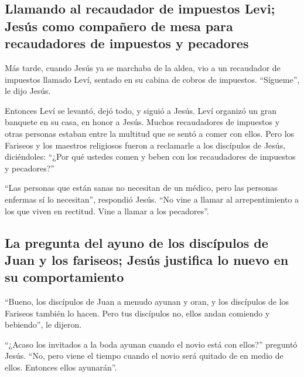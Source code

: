 \hypertarget{llamando-al-recaudador-de-impuestos-levi-jesuxfas-como-compauxf1ero-de-mesa-para-recaudadores-de-impuestos-y-pecadores}{%
\subsection{Llamando al recaudador de impuestos Levi; Jesús como
compañero de mesa para recaudadores de impuestos y
pecadores}\label{llamando-al-recaudador-de-impuestos-levi-jesuxfas-como-compauxf1ero-de-mesa-para-recaudadores-de-impuestos-y-pecadores}}

 Más tarde, cuando Jesús ya se marchaba de la aldea, vio
a un recaudador de impuestos llamado Leví, sentado en su cabina de
cobros de impuestos. ``Sígueme'', le dijo Jesús.

 Entonces Leví se levantó, dejó todo, y siguió a Jesús.
 Leví organizó un gran banquete en su casa, en honor a
Jesús. Muchos recaudadores de impuestos y otras personas estaban entre
la multitud que se sentó a comer con ellos. Pero los Fariseos y los
maestros religiosos fueron a reclamarle a los discípulos de Jesús,
diciéndoles:  ``¿Por qué ustedes comen y beben con los
recaudadores de impuestos y pecadores?''

 ``Las personas que están sanas no necesitan de un
médico, pero las personas enfermas sí lo necesitan'', respondió Jesús.
 ``No vine a llamar al arrepentimiento a los que viven en
rectitud. Vine a llamar a los pecadores''.

\hypertarget{la-pregunta-del-ayuno-de-los-discuxedpulos-de-juan-y-los-fariseos-jesuxfas-justifica-lo-nuevo-en-su-comportamiento}{%
\subsection{La pregunta del ayuno de los discípulos de Juan y los
fariseos; Jesús justifica lo nuevo en su
comportamiento}\label{la-pregunta-del-ayuno-de-los-discuxedpulos-de-juan-y-los-fariseos-jesuxfas-justifica-lo-nuevo-en-su-comportamiento}}

 ``Bueno, los discípulos de Juan a menudo ayunan y oran,
y los discípulos de los Fariseos también lo hacen. Pero tus discípulos
no, ellos andan comiendo y bebiendo'', le dijeron.

 ``¿Acaso los invitados a la boda ayunan cuando el novio
está con ellos?'' preguntó Jesús.  ``No, pero viene el
tiempo cuando el novio será quitado de en medio de ellos. Entonces ellos
ayunarán''.

